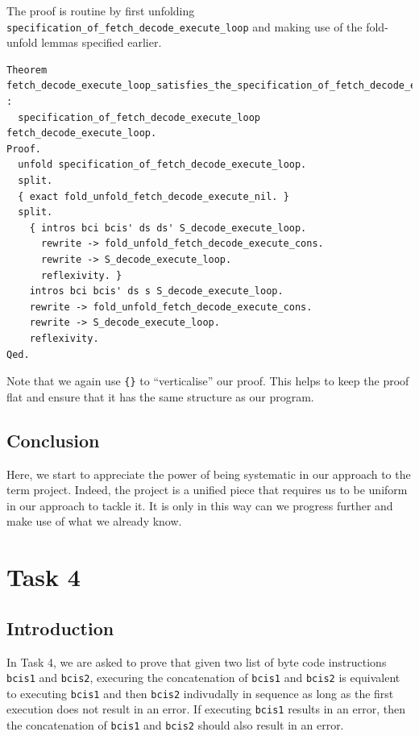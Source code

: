 \documentclass{article}
\begin{document}
The proof is routine by first unfolding \texttt{specification\_of\_fetch\_decode\_execute\_loop} and making use of the fold-unfold lemmas specified earlier. 

\begin{lstlisting}
Theorem fetch_decode_execute_loop_satisfies_the_specification_of_fetch_decode_execute_loop :
  specification_of_fetch_decode_execute_loop fetch_decode_execute_loop.
Proof.
  unfold specification_of_fetch_decode_execute_loop.
  split.
  { exact fold_unfold_fetch_decode_execute_nil. }
  split.
    { intros bci bcis' ds ds' S_decode_execute_loop.
      rewrite -> fold_unfold_fetch_decode_execute_cons.
      rewrite -> S_decode_execute_loop.
      reflexivity. }
    intros bci bcis' ds s S_decode_execute_loop.
    rewrite -> fold_unfold_fetch_decode_execute_cons.
    rewrite -> S_decode_execute_loop.
    reflexivity. 
Qed.
\end{lstlisting}

Note that we again use \texttt{\{\}} to ``verticalise'' our proof. This helps to keep the proof flat and ensure that it has the same structure as our program.

\subsection{Conclusion}
Here, we start to appreciate the power of being systematic in our approach to the term project. Indeed, the project is a unified piece that requires us to be uniform in our approach to tackle it. It is only in this way can we progress further and make use of what we already know. 

\section{Task 4}

\subsection{Introduction}

In Task 4, we are asked to prove that given two list of byte code instructions \texttt{bcis1} and \texttt{bcis2}, execuring the concatenation of \texttt{bcis1} and \texttt{bcis2} is equivalent to executing \texttt{bcis1} and then \texttt{bcis2} indivudally in sequence as long as the first execution does not result in an error. If executing \texttt{bcis1} results in an error, then the concatenation of \texttt{bcis1} and \texttt{bcis2} should also result in an error.
\end{document}
